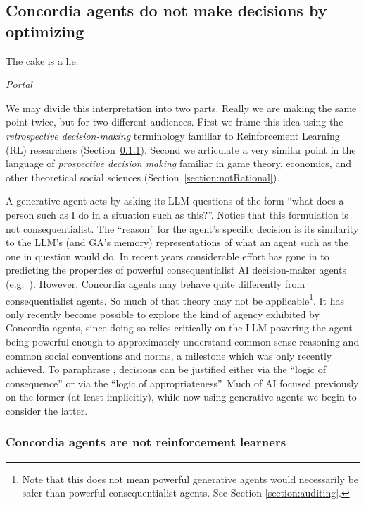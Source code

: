 \documentclass[11pt, a4paper, logo, twocolumn, internal, copyright, numbering]{googledeepmind}
\begin{document}
\subsection{Concordia agents do not make decisions by optimizing}
\epigraph{The cake is a lie.}{\textit{Portal}~\citep{portal2007}}

We may divide this interpretation into two parts. Really we are making the same point twice, but for two different audiences. First we frame this idea using the \textit{retrospective decision-making} terminology familiar to Reinforcement Learning (RL) researchers (Section~\ref{section:notRl}). Second we articulate a very similar point in the language of \textit{prospective decision making} familiar in game theory, economics, and other theoretical social sciences (Section~\ref{section:notRational}).

A generative agent acts by asking its LLM questions of the form ``what does a person such as I do in a situation such as this?''. Notice that this formulation is not consequentialist. The ``reason'' for the agent's specific decision is its similarity to the LLM's (and GA's memory) representations of what an agent such as the one in question would do. In recent years considerable effort has gone in to predicting the properties of powerful consequentialist AI decision-maker agents (e.g.~\cite{bostrom2014superintelligence, roff2020expected}). However, Concordia agents may behave quite differently from consequentialist agents. So much of that theory may not be applicable\footnote{Note that this does not mean powerful generative agents would necessarily be safer than powerful consequentialist agents. See Section \ref{section:auditing}.}. It has only recently become possible to explore the kind of agency exhibited by Concordia agents, since doing so relies critically on the LLM powering the agent being powerful enough to approximately understand common-sense reasoning and common social conventions and norms, a milestone which was only recently achieved. To paraphrase \cite{march2011logic}, decisions can be justified either via the ``logic of consequence'' or via the ``logic of appropriateness''. Much of AI focused previously on the former (at least implicitly), while now using generative agents we begin to consider the latter.


\subsubsection{Concordia agents are not reinforcement learners}\label{section:notRl}
\end{document}
